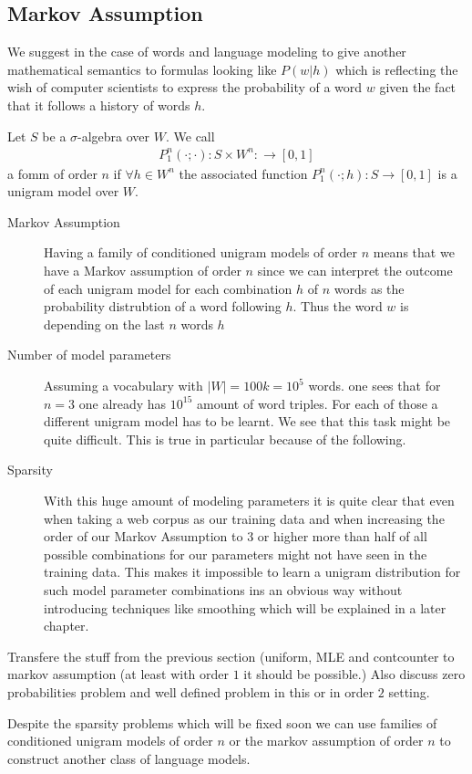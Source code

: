 \documentclass[•]{book}
\begin{document}
\subsection{Markov Assumption}
We suggest in the case of words and language modeling to give another mathematical semantics to formulas looking like $P(w|h)$ which is reflecting the wish of computer scientists to express the probability of a word $w$ given the fact that it follows a history of words $h$. 

\begin{definition}
Let $S$ be a $\sigma$-algebra over $W$.
We call
\begin{align}
P_1^n(\cdot ; \cdot): S\times W^{n}:\longrightarrow [0,1]
\end{align}
a \gls{fomm} of order $n$ if $\forall h\in W^n$ the associated function $P_1^n(\cdot ; h):S\longrightarrow [0,1]$ is a unigram model over $W$. 
\end{definition}
\begin{remark}
\begin{description}
\item[Markov Assumption]  Having a family of conditioned unigram models of order $n$ means that we have a Markov assumption of order $n$ since we can interpret the outcome of each unigram model for each combination $h$ of $n$ words as the probability distrubtion of a word following $h$. Thus the word $w$ is depending on the last $n$ words $h$
\item[Number of model parameters] Assuming a vocabulary with  $|W| = 100k = 10^5$ words. one sees that for $n=3$ one already has $10^{15}$ amount of word triples.  
For each of those a different unigram model has to be learnt.
We see that this task might be quite difficult. This is true in particular because of the following.  
\item[Sparsity] With this huge amount of modeling parameters it is quite clear that even when taking a web corpus as our training data and when increasing the order of our Markov Assumption to $3$ or higher more than half of all possible combinations for our parameters might not have seen in the training data.
This makes it impossible to learn a unigram distribution for such model parameter combinations ins an obvious way without introducing techniques like smoothing which will be explained in a later chapter.
\end{description}
\end{remark}
\begin{example}
Transfere the stuff from the previous section (uniform, MLE and contcounter to markov assumption (at least with order $1$ it should be possible.) Also discuss zero probabilities problem and well defined problem in this or in order $2$ setting. 
\end{example}
Despite the sparsity problems which will be fixed soon we can use families of conditioned unigram models of order $n$ or the markov assumption of order $n$ to construct another class of language models.  
\end{document}
